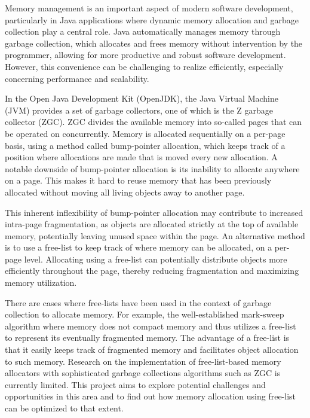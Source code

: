 
Memory management is an important aspect of modern software development, particularly in Java applications where dynamic memory allocation and garbage collection play a central role. Java automatically manages memory through garbage collection, which allocates and frees memory without intervention by the programmer, allowing for more productive and robust software development. However, this convenience can be challenging to realize efficiently, especially concerning performance and scalability.

In the Open Java Development Kit (OpenJDK), the Java Virtual Machine (JVM) provides a set of garbage collectors, one of which is the Z garbage collector (ZGC). ZGC divides the available memory into so-called pages that can be operated on concurrently. Memory is allocated sequentially on a per-page basis, using a method called bump-pointer allocation, which keeps track of a position where allocations are made that is moved every new allocation. A notable downside of bump-pointer allocation is its inability to allocate anywhere on a page. This makes it hard to reuse memory that has been previously allocated without moving all living objects away to another page.

This inherent inflexibility of bump-pointer allocation may contribute to increased intra-page fragmentation, as objects are allocated strictly at the top of available memory, potentially leaving unused space within the page. An alternative method is to use a free-list to keep track of where memory can be allocated, on a per-page level. Allocating using a free-list can potentially distribute objects more efficiently throughout the page, thereby reducing fragmentation and maximizing memory utilization.

There are cases where free-lists have been used in the context of garbage collection to allocate memory. For example, the well-established mark-sweep algorithm where memory does not compact memory and thus utilizes a free-list to represent its eventually fragmented memory. The advantage of a free-list is that it easily keeps track of fragmented memory and facilitates object allocation to such memory. Research on the implementation of free-list-based memory allocators with sophisticated garbage collections algorithms such as ZGC is currently limited. This project aims to explore potential challenges and opportunities in this area and to find out how memory allocation using free-list can be optimized to that extent.

